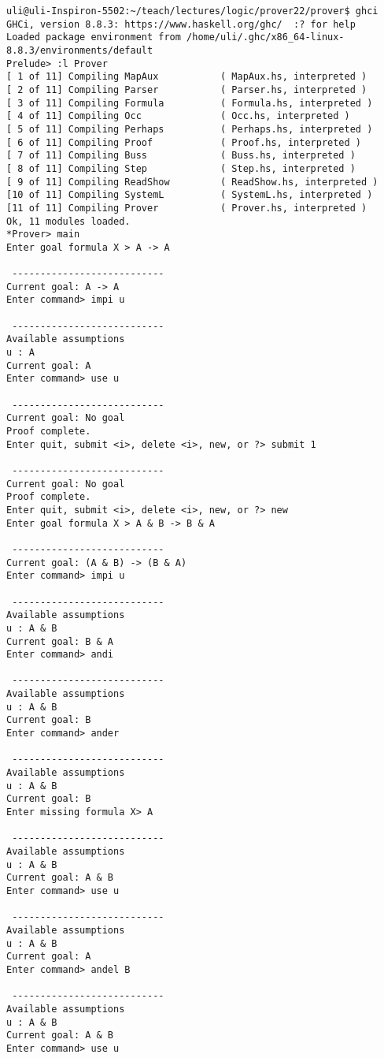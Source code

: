 \documentclass[12pt]{article}
\begin{document}
\begin{verbatim}
uli@uli-Inspiron-5502:~/teach/lectures/logic/prover22/prover$ ghci
GHCi, version 8.8.3: https://www.haskell.org/ghc/  :? for help
Loaded package environment from /home/uli/.ghc/x86_64-linux-8.8.3/environments/default
Prelude> :l Prover
[ 1 of 11] Compiling MapAux           ( MapAux.hs, interpreted )
[ 2 of 11] Compiling Parser           ( Parser.hs, interpreted )
[ 3 of 11] Compiling Formula          ( Formula.hs, interpreted )
[ 4 of 11] Compiling Occ              ( Occ.hs, interpreted )
[ 5 of 11] Compiling Perhaps          ( Perhaps.hs, interpreted )
[ 6 of 11] Compiling Proof            ( Proof.hs, interpreted )
[ 7 of 11] Compiling Buss             ( Buss.hs, interpreted )
[ 8 of 11] Compiling Step             ( Step.hs, interpreted )
[ 9 of 11] Compiling ReadShow         ( ReadShow.hs, interpreted )
[10 of 11] Compiling SystemL          ( SystemL.hs, interpreted )
[11 of 11] Compiling Prover           ( Prover.hs, interpreted )
Ok, 11 modules loaded.
*Prover> main
Enter goal formula X > A -> A

 --------------------------- 
Current goal: A -> A
Enter command> impi u

 --------------------------- 
Available assumptions
u : A
Current goal: A
Enter command> use u

 --------------------------- 
Current goal: No goal
Proof complete.
Enter quit, submit <i>, delete <i>, new, or ?> submit 1

 --------------------------- 
Current goal: No goal
Proof complete.
Enter quit, submit <i>, delete <i>, new, or ?> new
Enter goal formula X > A & B -> B & A

 --------------------------- 
Current goal: (A & B) -> (B & A)
Enter command> impi u

 --------------------------- 
Available assumptions
u : A & B
Current goal: B & A
Enter command> andi

 --------------------------- 
Available assumptions
u : A & B
Current goal: B
Enter command> ander

 --------------------------- 
Available assumptions
u : A & B
Current goal: B
Enter missing formula X> A

 --------------------------- 
Available assumptions
u : A & B
Current goal: A & B
Enter command> use u

 --------------------------- 
Available assumptions
u : A & B
Current goal: A
Enter command> andel B

 --------------------------- 
Available assumptions
u : A & B
Current goal: A & B
Enter command> use u


\end{verbatim}
\end{document}
